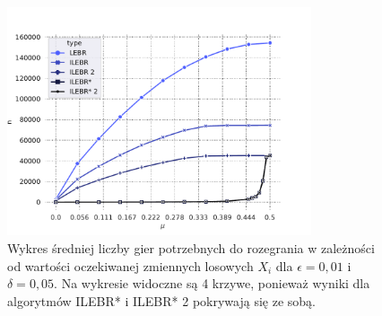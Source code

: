 \documentclass[inzynierska]{pwr_wmat_praca_dyplomowa}
\theoremstyle{plain}
\numberwithin{theorem}{chapter}
\theoremstyle{definition}
\numberwithin{theorem}{chapter}
\begin{document}
	\begin{figure}
		\centering
		\includegraphics[width=0.8\textwidth]{imagens/needed_games_to_play.pdf}
		\caption{Wykres średniej liczby gier potrzebnych do rozegrania w zależności od wartości oczekiwanej zmiennych losowych $X_i$ dla $\epsilon=0,01$ i $\delta = 0,05$. Na wykresie widoczne są 4 krzywe, ponieważ wyniki dla algorytmów ILEBR* i ILEBR* 2 pokrywają się ze sobą.}
		\label{fig:needed_games_to_play}
	\end{figure}
\end{document}
